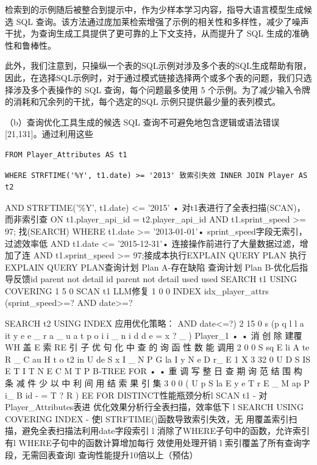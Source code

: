 \documentclass[12pt,a4paper,openright,UTF8]{ctexbook}
\begin{document}
检索到的示例随后被整合到提示中，作为少样本学习内容，指导大语言模型生成候选 SQL 查询。该方法通过庞加莱检索增强了示例的相关性和多样性，减少了噪声干扰，为查询生成工具提供了更可靠的上下文支持，从而提升了 SQL 生成的准确性和鲁棒性。


此外，我们注意到，只操纵一个表的SQL示例对涉及多个表的SQL生成帮助有限，因此，在选择SQL示例时，对于通过模式链接选择两个或多个表的问题，我们只选择涉及多个表操作的 SQL 查询，每个问题最多使用 5 个示例。为了减少输入令牌的消耗和冗余列的干扰，每个选定的SQL 示例只提供最少量的表列模式。


（b）查询优化工具生成的候选 SQL 查询不可避免地包含逻辑或语法错误[21,131]。通过利用这些

\begin{lstlisting}
FROM Player_Attributes AS t1
\end{lstlisting}


\begin{lstlisting}
WHERE STRFTIME('%Y', t1.date) >= '2013' 致索引失效 INNER JOIN Player AS t2
\end{lstlisting}

AND STRFTIME('\%Y', t1.date) <= '2015' • 对t1表进行了全表扫描(SCAN)，而非索引查 ON t1.player\_api\_id = t2.player\_api\_id AND t1.sprint\_speed >= 97; 找(SEARCH) WHERE t1.date >= '2013-01-01'• sprint\_speed字段无索引，过滤效率低 AND t1.date <= '2015-12-31'• 连接操作前进行了大量数据过滤，增加了连 AND t1.sprint\_speed >= 97;接成本执行EXPLAIN QUERY PLAN 执行EXPLAIN QUERY PLAN查询计划 Plan A-存在缺陷 查询计划 Plan B-优化后指导反馈id parent not detail id parent not detail used used SEARCH t1 USING COVERING 1 5 0 SCAN t1 LLM修复 1 0 0 INDEX idx\_player\_attrs (sprint\_speed>=? AND date>=?


SEARCH t2 USING INDEX 应用优化策略： AND date<=?) 2 15 0 s (p q l l a it y e e \_ r a \_ u a t p o i i \_ n i d d e = x ? \_ ) Player\_1 • • 消 创 除 建覆 WH 盖 E 索 RE 引 子 优 句 化 中 查 的 询 函 性 数 能 调用 2 0 0 S sq E li A te R \_ C au H t o t2 in U de S x I \_ N P G la I y N e D r\_ E 1 X 3 32 0 U D S IS E T I T N E C M T P B-TREE FOR • • 重 调 写 整 日 查 期 询 范 结 围 构 条 减 件 少 以 中 利 间 用 结 索 果 引 集 3 0 0 ( U p S la E y e T r E \_ M ap P i\_ B id - = T ? R ) EE FOR DISTINCT性能瓶颈分析l SCAN t1 - 对Player\_Attributes表进 优化效果分析行全表扫描，效率低下 l SEARCH USING COVERING INDEX - 使l STRFTIME()函数导致索引失效，无 用覆盖索引扫描，避免全表扫描法利用date字段索引 l 消除了WHERE子句中的函数，允许索引有l WHERE子句中的函数计算增加每行 效使用处理开销 l 索引覆盖了所有查询字段，无需回表查询l 查询性能提升10倍以上（预估）
\end{document}
